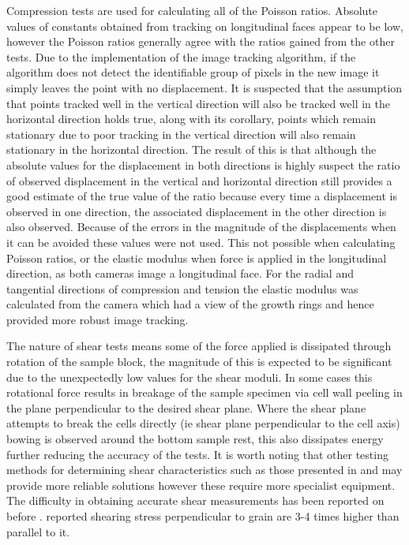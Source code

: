 \documentclass[10pt]{article}
\begin{document}
Compression tests are used for calculating all of the Poisson ratios. Absolute values of constants obtained from tracking on longitudinal faces appear to be low, however the Poisson ratios generally agree with the ratios gained from the other tests. Due to the implementation of the image tracking algorithm, if the algorithm does not detect the identifiable group of pixels in the new image it simply leaves the point with no displacement. It is suspected that the assumption that points tracked well in the vertical direction will also be tracked well in the horizontal direction holds true, along with its corollary, points which remain stationary due to poor tracking in the vertical direction will also remain stationary in the horizontal direction. The result of this is that although the absolute values for the displacement in both directions is highly suspect the ratio of observed displacement in the vertical and horizontal direction still provides a good estimate of the true value of the ratio because every time a displacement is observed in one direction, the associated displacement in the other direction is also observed. Because of the errors in the magnitude of the displacements when it can be avoided these values were not used. This not possible when calculating Poisson ratios, or the elastic modulus when force is applied in the longitudinal direction, as both cameras image a longitudinal face. For the radial and tangential directions of compression and tension the elastic modulus was calculated from the camera which had a view of the growth rings and hence provided more robust image tracking.

The nature of shear tests means some of the force applied is dissipated through rotation of the sample block, the magnitude of this is expected to be significant due to the unexpectedly low values for the shear moduli. In some cases this rotational force results in breakage of the sample specimen via cell wall peeling in the plane perpendicular to the desired shear plane. Where the shear plane attempts to break the cells directly (ie shear plane perpendicular to the cell axis) bowing is observed around the bottom sample rest, this also dissipates energy further reducing the accuracy of the tests. It is worth noting that other testing methods for determining shear characteristics such as those presented in \citep{bs_methods_1957} and \citep{kollmann_f._cote_principles_1968} may provide more reliable solutions however these require more specialist equipment. The difficulty in obtaining accurate shear measurements has been reported on before \citep{kollmann_f._cote_principles_1968, bodig_jozsef_jayne_mechanics_1982}. \citet{kollmann_f._cote_principles_1968}  reported shearing stress perpendicular to grain are 3-4 times higher than parallel to it.
\end{document}
